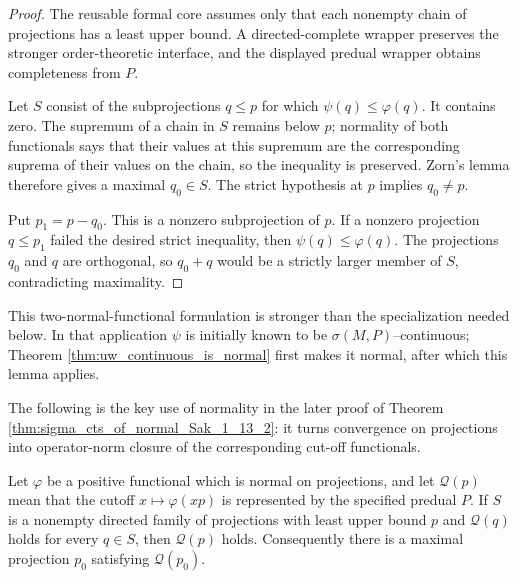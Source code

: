 \begin{proof}
  \leanok
  The reusable formal core assumes only that each nonempty chain of projections has a least upper
  bound. A directed-complete wrapper preserves the stronger order-theoretic interface, and the
  displayed predual wrapper obtains completeness from $P$.

  Let $S$ consist of the subprojections $q\le p$ for which
  $\psi(q)\le\varphi(q)$. It contains zero. The supremum of a chain in $S$ remains below $p$;
  normality of both functionals says that their values at this supremum are the corresponding
  suprema of their values on the chain, so the inequality is preserved. Zorn's lemma therefore
  gives a maximal $q_0\in S$. The strict hypothesis at $p$ implies $q_0\ne p$.

  Put $p_1=p-q_0$. This is a nonzero subprojection of $p$. If a nonzero projection
  $q\le p_1$ failed the desired strict inequality, then $\psi(q)\le\varphi(q)$. The projections
  $q_0$ and $q$ are orthogonal, so $q_0+q$ would be a strictly larger member of $S$, contradicting
  maximality.
\end{proof}

This two-normal-functional formulation is stronger than the specialization needed below. In that
application $\psi$ is initially known to be $\sigma(M,P)$--continuous; Theorem
\ref{thm:uw_continuous_is_normal} first makes it normal, after which this lemma applies.

The following is the key use of normality in the later proof of Theorem
\ref{thm:sigma_cts_of_normal_Sak_1_13_2}: it turns convergence on projections into operator-norm
closure of the corresponding cut-off functionals.

\begin{lemma}
  \label{lem:zorn_base}
  \leanok
  Let $\varphi$ be a positive functional which is normal on projections, and let
  $\mathscr{Q}(p)$ mean that the cutoff $x\mapsto\varphi(xp)$ is represented by the specified
  predual $P$. If $S$ is a nonempty directed family of projections with least upper bound $p$ and
  $\mathscr{Q}(q)$ holds for every $q\in S$, then $\mathscr{Q}(p)$ holds. Consequently there is a
  maximal projection $p_0$ satisfying $\mathscr{Q}(p_0)$.
\end{lemma}


